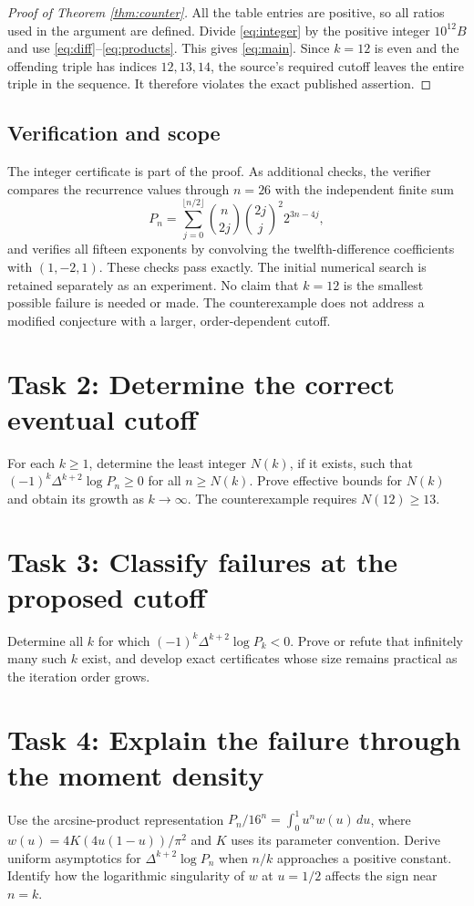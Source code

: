 \documentclass[11pt]{article}
\begin{document}
\begin{proof}[Proof of Theorem \ref{thm:counter}]
All the table entries are positive, so all ratios used in the argument
are defined. Divide \eqref{eq:integer} by the positive integer
$10^{12}B$ and use \eqref{eq:diff}--\eqref{eq:products}.
This gives \eqref{eq:main}. Since $k=12$ is even and the offending
triple has indices $12,13,14$, the source's required cutoff leaves
the entire triple in the sequence. It therefore violates the exact
published assertion.
\end{proof}

\subsection*{Verification and scope}
The integer certificate is part of the proof. As additional checks,
the verifier compares the recurrence values through $n=26$ with the
independent finite sum
\[
 P_n=\sum_{j=0}^{\lfloor n/2\rfloor}
       \binom n{2j}\binom{2j}j^2 2^{3n-4j},
\]
and verifies all fifteen exponents by convolving the twelfth-difference
coefficients with $(1,-2,1)$. These checks pass exactly.
The initial numerical search is retained separately as an experiment.
No claim that $k=12$ is the smallest possible failure is needed or made.
The counterexample does not address a modified conjecture with a
larger, order-dependent cutoff.

\section*{Task 2: Determine the correct eventual cutoff}
For each $k\geq1$, determine the least integer $N(k)$, if it exists,
such that $(-1)^k\Delta^{k+2}\log P_n\geq0$ for all $n\geq N(k)$.
Prove effective bounds for $N(k)$ and obtain its growth as $k\to\infty$.
The counterexample requires $N(12)\geq13$.

\section*{Task 3: Classify failures at the proposed cutoff}
Determine all $k$ for which
$(-1)^k\Delta^{k+2}\log P_k<0$.
Prove or refute that infinitely many such $k$ exist, and develop exact
certificates whose size remains practical as the iteration order grows.

\section*{Task 4: Explain the failure through the moment density}
Use the arcsine-product representation
$P_n/16^n=\int_0^1u^nw(u)\,du$, where
$w(u)=4K(4u(1-u))/\pi^2$ and $K$ uses its parameter convention.
Derive uniform asymptotics for $\Delta^{k+2}\log P_n$ when $n/k$
approaches a positive constant. Identify how the logarithmic
singularity of $w$ at $u=1/2$ affects the sign near $n=k$.
\end{document}
